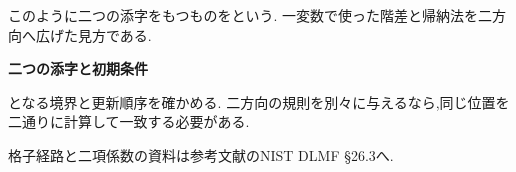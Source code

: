   このように二つの添字をもつものを\textbf{}という.
  一変数で使った階差と帰納法を二方向へ広げた見方である.

  \begin{bookpoint}
    \textbf{二つの添字と初期条件}\par
    となる境界と更新順序を確かめる.
    二方向の規則を別々に与えるなら,同じ位置を二通りに計算して一致する必要がある.
  \end{bookpoint}
  格子経路と二項係数の資料は参考文献のNIST DLMF §26.3へ.

